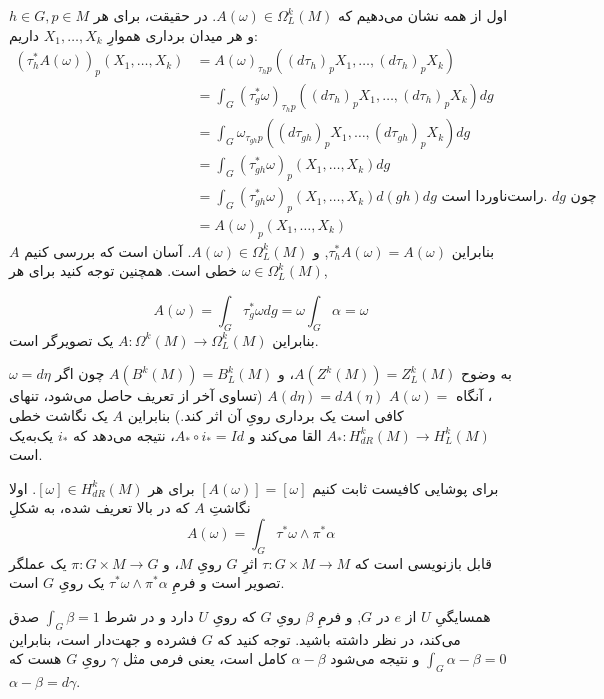 \documentclass[a4paper, 12pt]{article}
\begin{document}
اول از همه نشان می‌دهیم که  $A(\omega) \in \Omega_L^k(M)$.
در حقیقت، برای هر $h \in G, p \in M$
  و هر میدان برداری هموارِ $X_1, \ldots, X_k$
  داریم:
$$
\begin{aligned}
	\left(\tau_h^* A(\omega)\right)_p\left(X_1, \ldots, X_k\right) & =A(\omega)_{\tau_h p}\left(\left(d \tau_h\right)_p X_1, \ldots,\left(d \tau_h\right)_p X_k\right) \\
	& =\int_G\left(\tau_g^* \omega\right)_{\tau_h p}\left(\left(d \tau_h\right)_p X_1, \ldots,\left(d \tau_h\right)_p X_k\right) d g \\
	& =\int_G \omega_{\tau_{g h} p}\left(\left(d \tau_{g h}\right)_p X_1, \ldots,\left(d \tau_{g h}\right)_p X_k\right) d g \\
	& =\int_G\left(\tau_{g h}^* \omega\right)_p\left(X_1, \ldots, X_k\right) d g \\
	& =\int_G\left(\tau_{g h}^* \omega\right)_p\left(X_1, \ldots, X_k\right) d(g h) d g \text { راست‌ناوردا است. }  dg \text { چون } \\
	& =A(\omega)_p\left(X_1, \ldots, X_k\right)
\end{aligned}
$$
بنابراین $\tau_h^* A(\omega)=A(\omega)$,
 و $A(\omega) \in \Omega_L^k(M)$.
آسان است که بررسی کنیم $A$
 خطی است. همچنین توجه کنید برای هر $\omega \in \Omega_L^k(M)$,
 
$$
A(\omega)=\int_G \tau_g^* \omega d g=\omega \int_G \alpha=\omega
$$
بنابراین $A: \Omega^k(M) \rightarrow \Omega_L^k(M)$
یک تصویرگر
 است.

به وضوح $A\left(Z^k(M)\right)=Z_L^k(M)$،
 و $A\left(B^k(M)\right)=B_L^k(M)$
  چون اگر $\omega=d \eta$،  آنگاه  $A(\omega)=$ $A(d \eta)=d A(\eta)$
   (تساوی آخر از تعریف حاصل می‌شود، تنهای کافی است یک برداری رویِ آن اثر کند.)
 بنابراین $A$ 
یک نگاشت خطی  $A_*: H_{d R}^k(M) \rightarrow H_L^k(M)$ القا می‌کند و
   $A_* \circ i_*=I d$،
   نتیجه می‌دهد که  $i_*$ یک‌به‌یک است.
   
برای پوشایی کافیست ثابت کنیم $[A(\omega)]=[\omega]$
برای هر $[\omega] \in H_{d R}^k(M)$. 
اولا نگاشتِ $A$
  که در بالا تعریف شده، به شکلِ
$$
A(\omega)=\int_G \tau^* \omega \wedge \pi^* \alpha
$$
قابل بازنویسی است که
 $\tau: G \times M \rightarrow M$ 
اثرِ $G$
 رویِ $M$،
  و $\pi: G \times M \rightarrow G$
   یک عملگر تصویر است و فرمِ $\tau^* \omega \wedge \pi^* \alpha$
    یک 
    رویِ
     $G$ 
     است.

همسایگیِ
  $U$
 از $e$ 
 در $G$,
  و فرمِ $\beta$
   رویِ $G$
    که رویِ $U$ 
    دارد و در شرط
     $\int_G \beta=1$
     صدق می‌کند، در نظر داشته باشید.
     توجه کنید که  $G$
    فشرده و جهت‌دار است، بنابراین $\int_G \alpha-\beta=0$ 
     و نتیجه می‌شود $\alpha-\beta$ 
     کامل است، یعنی فرمی مثل $\gamma$
      رویِ $G$ 
      هست که $\alpha-\beta=d \gamma$.
\end{document}
